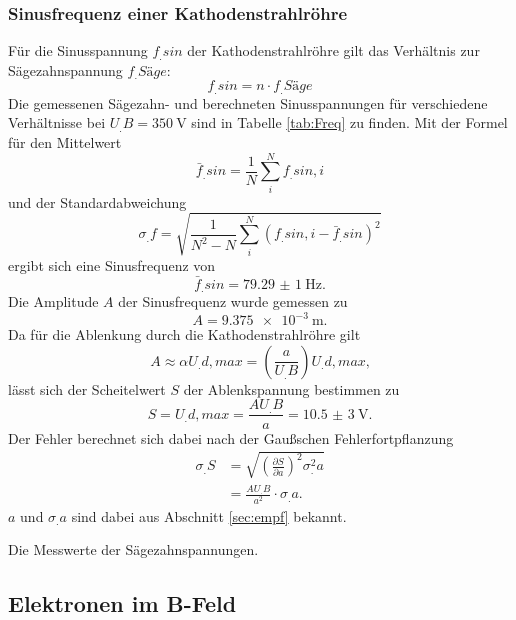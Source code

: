 \subsubsection{Sinusfrequenz einer Kathodenstrahlröhre}
Für die Sinusspannung $f_.{sin}$ der Kathodenstrahlröhre gilt das Verhältnis zur Sägezahnspannung $f_.{Säge}$:
\[
f_.{sin} = n\cdot f_.{Säge}
\]
Die gemessenen Sägezahn- und berechneten Sinusspannungen für verschiedene Verhältnisse bei $U_.B=\SI{350}{\volt}$ sind in Tabelle \ref{tab:Freq} zu finden.
Mit der Formel für den Mittelwert
\[
\bar{f}_.{sin}=\frac{1}{N}\sum_i^Nf_.{sin,i}
\]
und der Standardabweichung 
\[
\sigma_.f=\sqrt{\frac{1}{N^2-N}\sum_i^N\left(f_.{sin,i}-\bar{f}_.{sin}\right)^2}
\]
ergibt sich eine Sinusfrequenz von
\[
\bar{f}_.{sin}=\SI{79,29(1)}{\hertz}\text{.}
\]
\noindent Die Amplitude $A$ der Sinusfrequenz wurde gemessen zu
\[
A=\SI{9,375e-3}{\metre}\text{.}
\]
Da für die Ablenkung durch die Kathodenstrahlröhre gilt 
\[
A\approx\alpha U_.{d,max} = \left(\frac{a}{U_.B}\right)U_.{d,max}\text{,}
\]
lässt sich der Scheitelwert $S$ der Ablenkspannung bestimmen zu
\[
S=U_.{d,max}=\frac{AU_.B}{a}=\SI{10,5(3)}{\volt}\text{.}
\]
Der Fehler berechnet sich dabei nach der Gaußschen Fehlerfortpflanzung
\begin{align*}
\sigma_.S&=\sqrt{\left(\frac{\partial S}{\partial a}\right)^2\sigma^2_.a}\\
&=\frac{AU_.B}{a^2}\cdot \sigma_.a\text{.}
\end{align*}
$a$ und $\sigma_.a$ sind dabei aus Abschnitt \ref{sec:empf} bekannt.
\begin{table}
\centering
\caption{Die Messwerte der Sägezahnspannungen.}

\label{tab:Freq}
\end{table}

\subsection{Elektronen im B-Feld}
